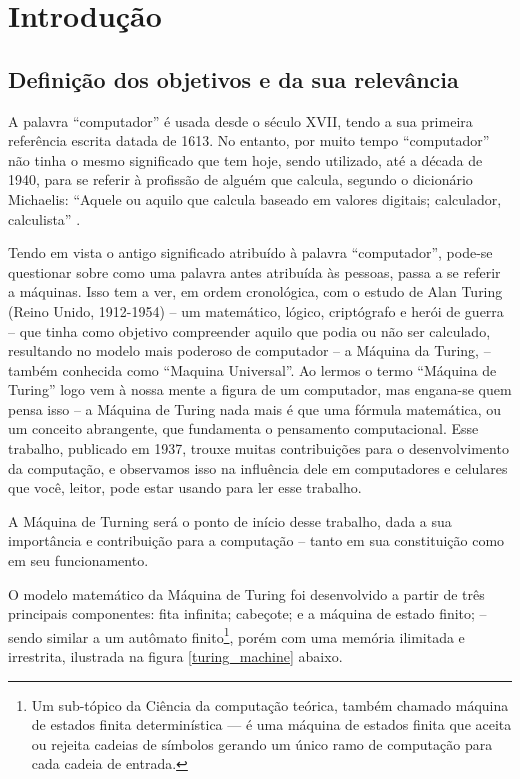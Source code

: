 \section{Introdução} 
\subsection{Definição dos objetivos e da sua relevância}
A palavra ``computador'' é usada desde o século XVII, tendo a sua primeira referência escrita datada de 1613. No entanto, por muito tempo ``computador'' não tinha o mesmo significado que tem hoje, sendo utilizado, até a década de 1940, para se referir à profissão de alguém que calcula, segundo o dicionário Michaelis: ``Aquele ou aquilo que calcula baseado em valores digitais; calculador, calculista'' \cite{4}.

Tendo em vista o antigo significado atribuído à palavra ``computador'', pode-se questionar sobre como uma palavra antes atribuída às pessoas, passa a se referir a máquinas. Isso tem a ver, em ordem cronológica, com o estudo de Alan Turing (Reino Unido, 1912-1954) – um matemático, lógico, criptógrafo e herói de guerra – que tinha como objetivo compreender aquilo que podia ou não ser calculado, resultando no modelo mais poderoso de computador – a Máquina da Turing, – também conhecida como ``Maquina Universal''. Ao lermos o termo ``Máquina de Turing'' logo vem à nossa mente a figura de um computador, mas engana-se quem pensa isso – a Máquina de Turing nada mais é que uma fórmula matemática, ou um conceito abrangente, que fundamenta o pensamento computacional. Esse trabalho, publicado em 1937, trouxe muitas contribuições para o desenvolvimento da computação, e observamos isso na influência dele em computadores e celulares que você, leitor, pode estar usando para ler esse  trabalho.  

A Máquina de Turning será o ponto de início desse trabalho, dada a sua importância e contribuição para a computação – tanto em sua constituição como em seu funcionamento. 

O modelo matemático da Máquina de Turing foi desenvolvido a partir de três principais componentes: fita infinita; cabeçote; e a máquina de estado finito; – sendo similar a um autômato finito\footnote{Um sub-tópico da Ciência da computação teórica, também chamado máquina de estados finita determinística — é uma máquina de estados finita que aceita ou rejeita cadeias de símbolos gerando um único ramo de computação para cada cadeia de entrada.}, porém com uma memória ilimitada e irrestrita, ilustrada na figura \ref{turing_machine} abaixo.

